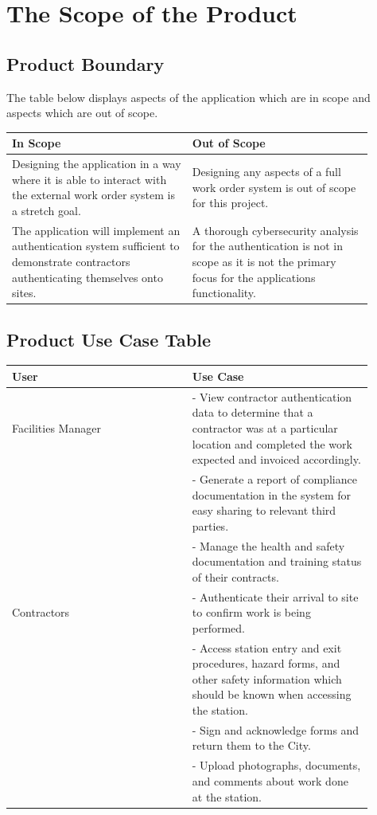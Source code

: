 \documentclass[12pt]{article}
\begin{document}
\section{The Scope of the Product}
\subsection{Product Boundary}

The table below displays aspects of the application which are in scope and
aspects which are out of scope. \\

\begin{tabular}{|p{0.45\linewidth}|p{0.45\linewidth}|}
\hline
\textbf{In Scope} & \textbf{Out of Scope} \\ 
\hline
Designing the application in a way where it is able to interact with the 
external work order system is a stretch goal.& Designing any aspects of a full 
work order system is out of scope for this project. \\
\hline
The application will implement an authentication system sufficient to 
demonstrate contractors authenticating themselves onto sites. & A thorough 
cybersecurity analysis for the authentication is not in scope as it is not the 
primary focus for the applications functionality. \\
\hline
\end{tabular}

\subsection{Product Use Case Table}

\begin{tabular}{|p{0.45\linewidth}|p{0.45\linewidth}|}
\hline
\textbf{User}& \textbf{Use Case} \\ 
\hline
Facilities Manager & - View contractor authentication data to determine that
a contractor was at a particular location and completed the work expected
and invoiced accordingly. \\
& - Generate a report of compliance documentation in the system for easy
sharing to relevant third parties. \\
& - Manage the health and safety documentation and training status of
their contracts.\\
\hline
Contractors & - Authenticate their arrival to site to confirm work is being
performed.\\
& - Access station entry and exit procedures, hazard forms, and other safety
information which should be known when accessing the station.\\
& - Sign and acknowledge forms and return them to the City.\\
& - Upload photographs, documents, and comments about work done at the station. \\
\hline
\end{tabular}
\end{document}
